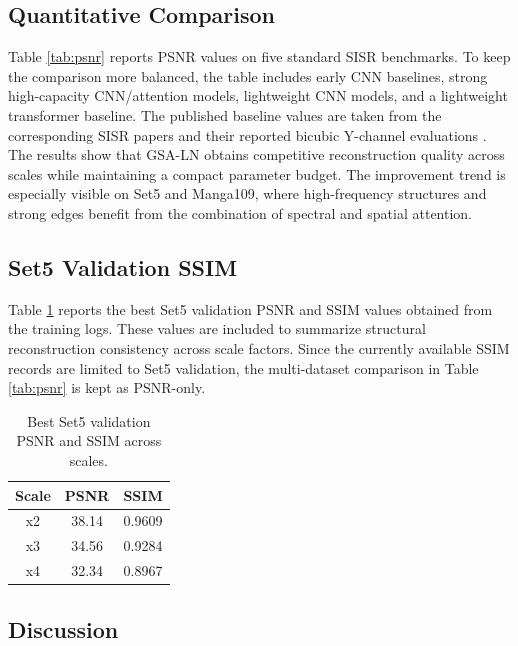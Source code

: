 \documentclass[conference]{IEEEtran}
\begin{document}
\subsection{Quantitative Comparison}

Table \ref{tab:psnr} reports PSNR values on five standard SISR benchmarks. To keep the comparison more balanced, the table includes early CNN baselines, strong high-capacity CNN/attention models, lightweight CNN models, and a lightweight transformer baseline. The published baseline values are taken from the corresponding SISR papers and their reported bicubic Y-channel evaluations \cite{kim2016vdsr,lim2017edsr,zhang2018rcan,hui2019imdn,liu2020rfdn,liang2021swinir,lan2021madnet,chu2021falsr,zhu2019cbpn,jiang2020hdrn,wang2020a2fs}. The results show that GSA-LN obtains competitive reconstruction quality across scales while maintaining a compact parameter budget. The improvement trend is especially visible on Set5 and Manga109, where high-frequency structures and strong edges benefit from the combination of spectral and spatial attention.

\subsection{Set5 Validation SSIM}

Table \ref{tab:set5_ssim} reports the best Set5 validation PSNR and SSIM values obtained from the training logs. These values are included to summarize structural reconstruction consistency across scale factors. Since the currently available SSIM records are limited to Set5 validation, the multi-dataset comparison in Table \ref{tab:psnr} is kept as PSNR-only.

\begin{table}[H]
\centering
\caption{Best Set5 validation PSNR and SSIM across scales.}
\label{tab:set5_ssim}
\begin{tabular}{ccc}
\toprule
Scale & PSNR & SSIM \\
\midrule
x2 & 38.14 & 0.9609 \\
x3 & 34.56 & 0.9284 \\
x4 & 32.34 & 0.8967 \\
\bottomrule
\end{tabular}
\end{table}

\subsection{Discussion}
\end{document}

